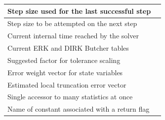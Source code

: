 \documentclass[letterpaper,10pt,english]{sphinxmanual}
\begin{document}
\begin{tabulary}{\linewidth}{|L|L|}
Step size used for the last successful step
 & 
{\hyperref[c_interface/User_callable:ARKodeGetLastStep]{}}
\\\hline

Step size to be attempted on the next step
 & 
{\hyperref[c_interface/User_callable:ARKodeGetCurrentStep]{}}
\\\hline

Current internal time reached by the solver
 & 
{\hyperref[c_interface/User_callable:ARKodeGetCurrentTime]{}}
\\\hline

Current ERK and DIRK Butcher tables
 & 
{\hyperref[c_interface/User_callable:ARKodeGetCurrentButcherTables]{}}
\\\hline

Suggested factor for tolerance scaling
 & 
{\hyperref[c_interface/User_callable:ARKodeGetTolScaleFactor]{}}
\\\hline

Error weight vector for state variables
 & 
{\hyperref[c_interface/User_callable:ARKodeGetErrWeights]{}}
\\\hline

Estimated local truncation error vector
 & 
{\hyperref[c_interface/User_callable:ARKodeGetEstLocalErrors]{}}
\\\hline

Single accessor to many statistics at once
 & 
{\hyperref[c_interface/User_callable:ARKodeGetIntegratorStats]{}}
\\\hline

Name of constant associated with a return flag
 & 
{\hyperref[c_interface/User_callable:ARKodeGetReturnFlagName]{}}
\\\hline
\end{tabulary}

\end{document}
